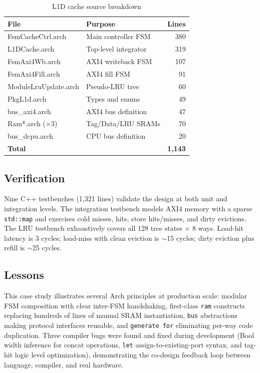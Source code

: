 \documentclass[11pt,twocolumn]{article}
\begin{document}
\begin{table}[t]
\centering
\caption{L1D cache source breakdown}
\label{tab:l1d}
\footnotesize
\begin{tabular}{@{}llr@{}}
\toprule
\textbf{File} & \textbf{Purpose} & \textbf{Lines} \\
\midrule
FsmCacheCtrl.arch & Main controller FSM & 380 \\
L1DCache.arch & Top-level integrator & 319 \\
FsmAxi4Wb.arch & AXI4 writeback FSM & 107 \\
FsmAxi4Fill.arch & AXI4 fill FSM & 91 \\
ModuleLruUpdate.arch & Pseudo-LRU tree & 60 \\
PkgL1d.arch & Types and enums & 49 \\
bus\_axi4.arch & AXI4 bus definition & 47 \\
Ram*.arch ($\times$3) & Tag/Data/LRU SRAMs & 70 \\
bus\_dcpu.arch & CPU bus definition & 20 \\
\midrule
\textbf{Total} & & \textbf{1,143} \\
\bottomrule
\end{tabular}
\end{table}

\subsection{Verification}

Nine C++ testbenches (1,321 lines) validate the design at both unit and integration levels. The integration testbench models AXI4 memory with a sparse \texttt{std::map} and exercises cold misses, hits, store hits/misses, and dirty evictions. The LRU testbench exhaustively covers all 128 tree states $\times$ 8 ways. Load-hit latency is 3 cycles; load-miss with clean eviction is ${\sim}$15 cycles; dirty eviction plus refill is ${\sim}$25 cycles.

\subsection{Lessons}

This case study illustrates several Arch principles at production scale: modular FSM composition with clear inter-FSM handshaking, first-class \texttt{ram} constructs replacing hundreds of lines of manual SRAM instantiation, \texttt{bus} abstractions making protocol interfaces reusable, and \texttt{generate for} eliminating per-way code duplication. Three compiler bugs were found and fixed during development (Bool width inference for concat operations, \texttt{let} assign-to-existing-port syntax, and tag-hit logic level optimization), demonstrating the co-design feedback loop between language, compiler, and real hardware.
\end{document}
